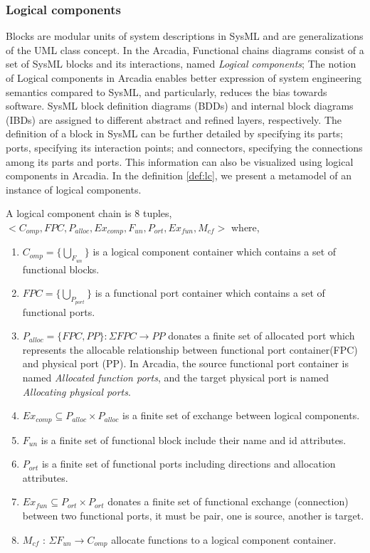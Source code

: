 \subsubsection{Logical components}
Blocks are modular units of system descriptions in SysML and are generalizations of the UML class concept. In the Arcadia, Functional chains diagrams consist of a set of SysML blocks and its interactions, named \textit{Logical components}; The notion of Logical components in Arcadia enables better expression of system engineering semantics compared to SysML, and particularly, reduces the bias towards software. SysML block definition diagrams (BDDs) and internal block diagrams (IBDs) are assigned to different abstract and refined layers, respectively. The definition of a block in SysML can be further detailed by specifying its parts; ports, specifying its interaction points; and connectors, specifying the connections among its parts and ports. This information can also be visualized using logical components in Arcadia. In the definition \ref{def:lc}, we present a metamodel of an instance of logical components.

\label{def:lc}
    A logical component chain is 8 tuples, $< C_{omp}, FPC, P_{alloc}, Ex_{comp}, F_{un}, P_{ort}, Ex_{fun}, M_{cf}>$ where,
\begin{enumerate}
\item $C_{omp}=\{\bigcup_{F_{un}}\}$ is a logical component container which contains a set of functional blocks.
\item $FPC=\{\bigcup_{P_{port}}\}$ is a functional port container which contains a set of functional ports.
\item $P_{alloc}=\{FPC, PP\}: \Sigma FPC \rightarrow PP$ donates a finite set of allocated port which represents the allocable relationship between functional port container(FPC) and physical port (PP). In Arcadia, the source functional port container is named \textit{Allocated function ports}, and the target physical port is named \textit{Allocating physical ports}.
\item $Ex_{comp} \subseteq P_{alloc} \times P_{alloc}$ is a finite set of exchange between logical components.   
\item $F_{un}$ is a finite set of functional block include their name and id attributes.
\item $P_{ort}$ is a finite set of functional ports including directions and allocation attributes.
\item $Ex_{fun} \subseteq P_{ort} \times P_{ort}$ donates a finite set of functional exchange (connection) between two functional ports, it must be pair, one is source, another is target. 
\item $M_{cf}$ : $\Sigma F_{un} \rightarrow C_{omp}$ allocate functions to a logical component container.
\end{enumerate} %


